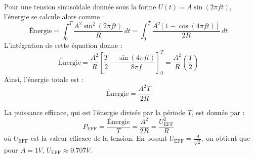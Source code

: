 Pour une tension sinusoïdale donnée sous la forme $U(t) = A \sin(2 \pi f t)$, l'énergie se calcule alors comme :
\[
\text{Énergie} = \int_0^T \frac{A^2 \sin^2(2 \pi f t)}{R} \, dt = \int_0^T \frac{A^2 [1 - \cos(4 \pi f t)]}{2 R} \, dt
\]
L'intégration de cette équation donne :
\[
\text{Énergie} = \frac{A^2}{R} \left[ \frac{T}{2} - \frac{\sin(4 \pi f t)}{8 \pi f} \right]_0^T = \frac{A^2}{R} \left( \frac{T}{2} \right)
\]
Ainsi, l'énergie totale est :
\[
\text{Énergie} = \frac{A^2 T}{2 R}
\]

La puissance efficace, qui est l'énergie divisée par la période $T$, est donnée par :
\[
P_{\text{EFF}} = \frac{\text{Énergie}}{T} = \frac{A^2}{2R} = \frac{U_{\text{EFF}}^2}{R}
\]
où $U_{\text{EFF}}$ est la valeur efficace de la tension. En posant $U_{\text{EFF}} = \frac{A}{\sqrt{2}}$, on obtient que pour $A = 1V$, $U_{\text{EFF}} \approx 0.707 V$.
